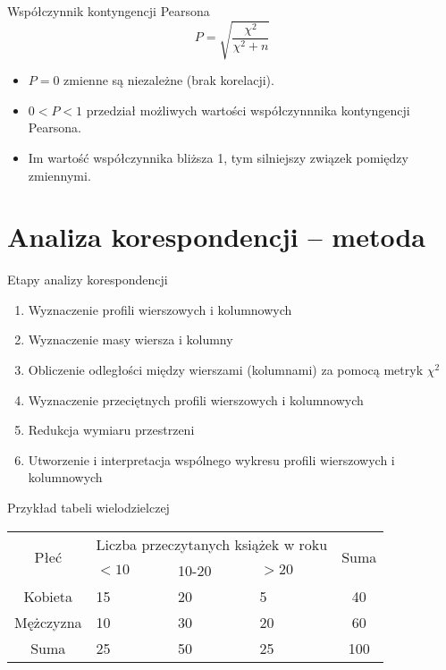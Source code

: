 \documentclass{beamer}
\begin{document}
\begin{frame}{Współczynnik kontyngencji Pearsona}
  $$P = \sqrt{\frac{\chi^2}{\chi^2 +n}} $$
  \begin{itemize}
  \item $P = 0$ zmienne są niezależne (brak korelacji).
  \item $0 < P < 1$ przedział możliwych wartości współczynnnika kontyngencji Pearsona.
  \item Im wartość współczynnika bliższa 1, tym silniejszy związek pomiędzy zmiennymi.
  \end{itemize}
\end{frame}

\section{Analiza korespondencji -- metoda}
\begin{frame}{Etapy analizy korespondencji}
  \begin{enumerate}
  \item Wyznaczenie profili wierszowych i kolumnowych
  \item Wyznaczenie masy wiersza i kolumny
  \item Obliczenie odległości między wierszami (kolumnami) za pomocą metryk $\chi^2$
  \item Wyznaczenie przeciętnych profili wierszowych i kolumnowych
  \item Redukcja wymiaru przestrzeni
  \item Utworzenie i interpretacja wspólnego wykresu profili wierszowych i kolumnowych
  \end{enumerate}
\end{frame}

\begin{frame}{Przykład tabeli wielodzielczej}
\begin{tabular}{|c|p{2cm}|p{2cm}|p{2cm}|c|}\hline
\multirow{2}{*}{Płeć} & \multicolumn{3}{|c|}{Liczba przeczytanych książek w roku}& \multirow{2}{*}{Suma}\\
& $<10$ & 10-20 & $>20$ & \\ \hline
Kobieta & 15 & 20 & 5 & 40\\\hline
Mężczyzna & 10 & 30 & 20 & 60\\\hline
Suma & 25 & 50 & 25 & 100\\\hline
\end{tabular}
\end{frame}
\end{document}
